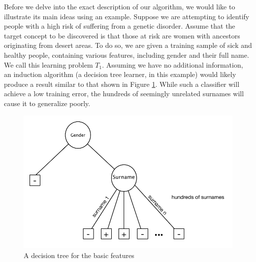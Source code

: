 \documentclass{article}
\theoremstyle{definition}
\begin{document}
Before we delve into the exact description of our algorithm, we would like to illustrate its main ideas using an example.
Suppose we are attempting to identify people with a high risk of suffering from a genetic disorder. Assume that the target concept to be discovered is that those at risk are women with ancestors originating from desert areas. To do so, we are given a training sample of sick and healthy people, containing various features, including gender and their full name. We call this learning problem $T_1$.
Assuming we have no additional information, an induction algorithm (a decision tree learner, in this example) would likely produce a result similar to that shown in Figure \ref{fig:tree_base}. While such a classifier will achieve a low training error, the hundreds of seemingly unrelated surnames will cause it to generalize poorly. %

\begin{figure}[h]
	\centering
	\includegraphics[width=0.8\linewidth]{fig1.pdf}
	\caption{A decision tree for the basic features}
	\label{fig:tree_base}
\end{figure}
\end{document}
